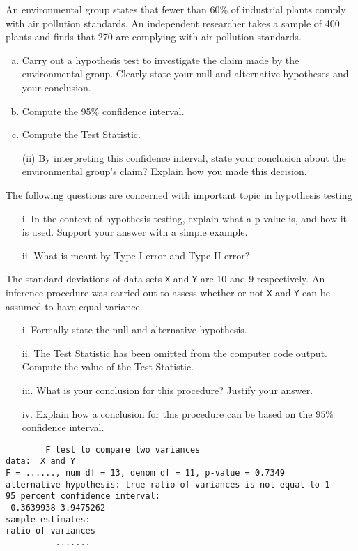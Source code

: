     \item 
    

An environmental group states that fewer than 60\% of industrial plants comply with air pollution standards. An independent researcher takes a sample of 400 plants and finds that 270 are complying with air pollution standards. 
\begin{enumerate}[(a)]
	\item  Carry out a hypothesis test to investigate the claim made by the environmental group. Clearly state your null and alternative hypotheses and your conclusion.
	\item Compute the 95\% confidence interval.
	\item Compute the Test Statistic.
	\item[(ii)] By interpreting this confidence interval, state your conclusion about the environmental group's claim? Explain how you made this decision.
\end{enumerate}

\item The following questions are concerned with important topic in hypothesis testing
\begin{itemize}
\item[i.] In the context of hypothesis testing, explain what a p-value is, and how it is used. Support your answer with a simple example.
\item[ii.]What is meant by Type I error and Type II error?
\end{itemize}

\item 
The standard deviations of data sets \texttt{X} and \texttt{Y} are 10 and 9 respectively. An inference procedure was carried out to assess whether or not \texttt{X} and \texttt{Y} can be assumed to have equal variance.
\begin{itemize}
\item[i.] Formally state the null and alternative hypothesis.
\item[ii.] The Test Statistic has been omitted from the computer code output. Compute the value of the Test Statistic.
\item[iii.] What is your conclusion for this procedure? Justify your answer.
\item[iv.] Explain how a conclusion for this procedure can be based on the $95\%$ confidence interval.
\end{itemize}

\begin{framed}
\begin{verbatim}
        F test to compare two variances
data:  X and Y
F = ......, num df = 13, denom df = 11, p-value = 0.7349
alternative hypothesis: true ratio of variances is not equal to 1
95 percent confidence interval:
 0.3639938 3.9475262
sample estimates:
ratio of variances
          .......
\end{verbatim}
\end{framed}
